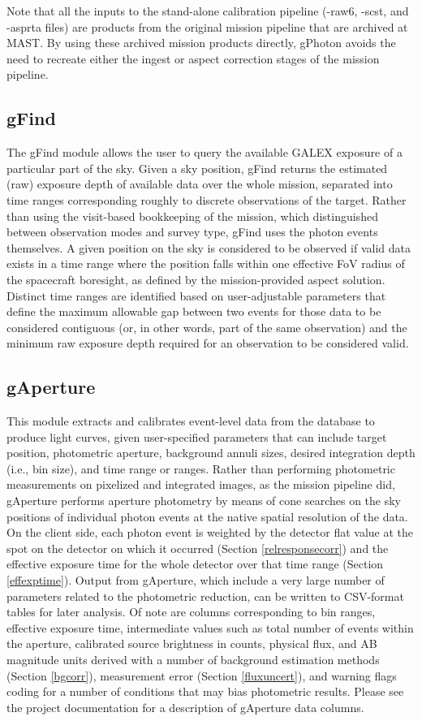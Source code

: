 \documentclass[preprint]{aastex}
\begin{document}
Note that all the inputs to the stand-alone calibration pipeline (-raw6, -scst, and -asprta files) are products from the original mission pipeline that are archived at MAST. By using these archived mission products directly, gPhoton avoids the need to recreate either the ingest or aspect correction stages of the mission pipeline.

\subsection{gFind}
\label{gfind}
The gFind module allows the user to query the available GALEX exposure of a particular part of the sky. Given a sky position, gFind returns the estimated (raw) exposure depth of available data over the whole mission, separated into time ranges corresponding roughly to discrete observations of the target. Rather than using the visit-based bookkeeping of the mission, which distinguished between observation modes and survey type, gFind uses the photon events themselves. A given position on the sky is considered to be observed if valid data exists in a time range where the position falls within one effective FoV radius of the spacecraft boresight, as defined by the mission-provided aspect solution. Distinct time ranges are identified based on user-adjustable parameters that define the maximum allowable gap between two events for those data to be considered contiguous (or, in other words, part of the same observation) and the minimum raw exposure depth required for an observation to be considered valid.

\subsection{gAperture}
This module extracts and calibrates event-level data from the database to produce light curves, given user-specified parameters that can include target position, photometric aperture, background annuli sizes, desired integration depth (i.e., bin size), and time range or ranges. Rather than performing photometric measurements on pixelized and integrated images, as the mission pipeline did, gAperture performs aperture photometry by means of cone searches on the sky positions of individual photon events at the native spatial resolution of the data. On the client side, each photon event is weighted by the detector flat value at the spot on the detector on which it occurred (Section \ref{relresponsecorr}) and the effective exposure time for the whole detector over that time range (Section \ref{effexptime}). Output from gAperture, which include a very large number of parameters related to the photometric reduction, can be written to CSV-format tables for later analysis. Of note are columns corresponding to bin ranges, effective exposure time, intermediate values such as total number of events within the aperture, calibrated source brightness in counts, physical flux, and AB magnitude units derived with a number of background estimation methods (Section \ref{bgcorr}), measurement error (Section \ref{fluxuncert}), and warning flags coding for a number of conditions that may bias photometric results. Please see the project documentation for a description of gAperture data columns.
\end{document}
